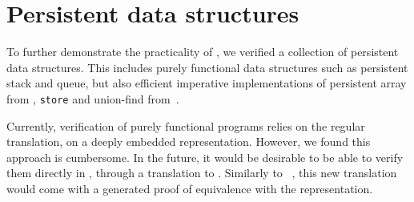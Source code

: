 \section{Persistent data structures}
\label{sec:persistent}

To further demonstrate the practicality of \Zoo, we verified a collection of persistent data structures.
This includes purely functional data structures such as persistent stack and queue, but also efficient imperative implementations of persistent array from \citet*{DBLP:conf/ml/ConchonF07}, \texttt{store} and union-find from~\citet*{DBLP:journals/pacmpl/AllainC0S24}.

Currently, verification of purely functional programs relies on the regular \ZooLang translation, \ie on a deeply embedded representation.
However, we found this approach is cumbersome.
In the future, it would be desirable to be able to verify them directly in \Rocq, through a translation to \Gallina.
Similarly to \Hacspec~\citep*{DBLP:conf/cpp/HaselwarterHHWH24}, this new translation would come with a generated proof of equivalence with the \ZooLang representation.

